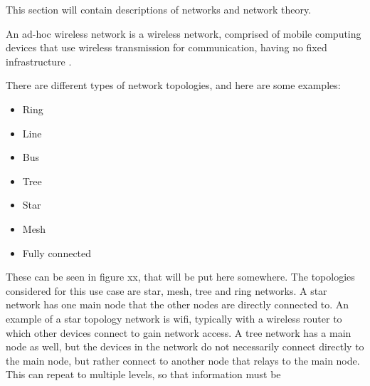 This section will contain descriptions of networks and network theory.

An ad-hoc wireless network is a wireless network, comprised of mobile computing devices that use wireless transmission for communication, having no fixed infrastructure \cite{murthy2004ad}. 

There are different types of network topologies, and here are some examples:
\begin{itemize}
	\item Ring
	\item Line
	\item Bus
	\item Tree
	\item Star
	\item Mesh
	\item Fully connected
\end{itemize}

These can be seen in figure xx, that will be put here somewhere. The topologies considered for this use case are star, mesh, tree and ring networks. A star network has one main node that the other nodes are directly connected to. An example of a star topology network is wifi, typically with a wireless router to which other devices connect to gain network access. A tree network has a main node as well, but the devices in the network do not necessarily connect directly to the main node, but rather connect to another node that relays to the main node. This can repeat to multiple levels, so that information must be 